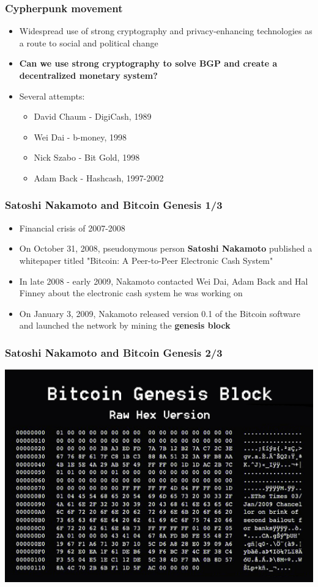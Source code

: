 \documentclass{beamer}
\begin{document}
\begin{frame}
  \frametitle{Cypherpunk movement}
  \begin{itemize}
  \item Widespread use of strong cryptography and privacy-enhancing technologies
    as a route to social and political change
  \item \textbf{Can we use strong cryptography to solve BGP and create a
      decentralized monetary system?}
  \item Several attempts:
    \begin{itemize}
    \item David Chaum - DigiCash, 1989
    \item Wei Dai - b-money, 1998
    \item Nick Szabo - Bit Gold, 1998
    \item Adam Back - Hashcash, 1997-2002
    \end{itemize}
  \end{itemize}
\end{frame}

\begin{frame}
  \frametitle{Satoshi Nakamoto and Bitcoin Genesis 1/3}
  \begin{itemize}
  \item Financial crisis of 2007-2008
  \item On October 31, 2008, pseudonymous person \textbf{Satoshi Nakamoto}
    published a whitepaper titled "Bitcoin: A Peer-to-Peer Electronic Cash
    System"
  \item In late 2008 - early 2009, Nakamoto contacted Wei Dai, Adam Back and Hal
    Finney about the electronic cash system he was working on
  \item On January 3, 2009, Nakamoto released version 0.1 of the Bitcoin
    software and launched the network by mining the \textbf{genesis block}
  \end{itemize}
\end{frame}

\begin{frame}[fragile]
  \frametitle{Satoshi Nakamoto and Bitcoin Genesis 2/3}
  \includegraphics[width=\textwidth]{genesis-block}
\end{frame}
\end{document}
